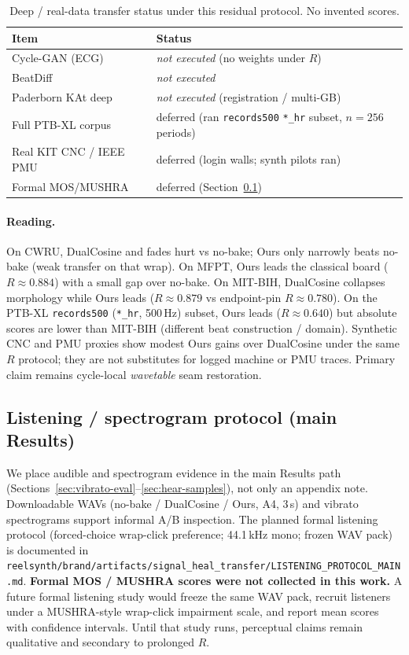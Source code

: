 \begin{table}[t]
  \centering
  \caption{Deep / real-data transfer status under this residual protocol.
    No invented scores.}
  \label{tab:transfer-sota-status}
  \setlength{\tabcolsep}{3pt}
  \begin{tabular}{@{}lp{}@{}}
    \toprule
    Item & Status \\
    \midrule
    Cycle-GAN (ECG) & \emph{not executed} (no weights under $R$) \\
    BeatDiff & \emph{not executed} \\
    Paderborn KAt deep & \emph{not executed} (registration / multi-GB) \\
    Full PTB-XL corpus & deferred (ran \texttt{records500} \texttt{*\_hr} subset, $n{=}256$ periods) \\
    Real KIT CNC / IEEE PMU & deferred (login walls; synth pilots ran) \\
    Formal MOS/MUSHRA & deferred (Section~\ref{sec:listening-protocol}) \\
    \bottomrule
  \end{tabular}
\end{table}

\paragraph{Reading.}
On CWRU, DualCosine and fades hurt vs no-bake; Ours only narrowly beats no-bake (weak transfer on that wrap).
On MFPT, Ours leads the classical board ($R{\approx}0.884$) with a small gap over no-bake.
On MIT-BIH, DualCosine collapses morphology while Ours leads ($R{\approx}0.879$ vs endpoint-pin $R{\approx}0.780$).
On the PTB-XL \texttt{records500} (\texttt{*\_hr}, 500\,Hz) subset, Ours leads ($R{\approx}0.640$) but absolute scores are lower than MIT-BIH (different beat construction / domain).
Synthetic CNC and PMU proxies show modest Ours gains over DualCosine under the same $R$ protocol; they are not substitutes for logged machine or PMU traces.
Primary claim remains cycle-local \emph{wavetable} seam restoration.



\subsection{Listening / spectrogram protocol (main Results)}
\label{sec:listening-protocol}

We place audible and spectrogram evidence in the main Results path (Sections~\ref{sec:vibrato-eval}--\ref{sec:hear-samples}), not only an appendix note.
Downloadable WAVs (no-bake / DualCosine / Ours, A4, $3$\,s) and vibrato spectrograms support informal A/B inspection.
The planned formal listening protocol (forced-choice wrap-click preference; 44.1\,kHz mono; frozen WAV pack) is documented in
\texttt{reelsynth/brand/artifacts/signal\_heal\_transfer/LISTENING\_PROTOCOL\_MAIN.md}.
\textbf{Formal MOS / MUSHRA scores were not collected in this work.}
A future formal listening study would freeze the same WAV pack, recruit listeners under a MUSHRA-style wrap-click impairment scale, and report mean scores with confidence intervals.
Until that study runs, perceptual claims remain qualitative and secondary to prolonged $R$.
